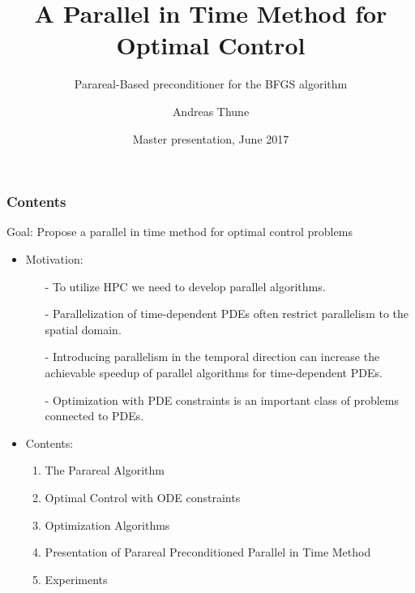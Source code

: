 \documentclass[9pt]{beamer}
\title{A Parallel in Time Method for Optimal Control}
\subtitle{Parareal-Based preconditioner for the BFGS algorithm}
\author{Andreas Thune}
\institute[UiO]{Faculty of Mathematics \\University of Oslo,\\Simula Research Laboratory}
\date{Master presentation, June 2017}
\begin{document}
 
\frame{\titlepage}
\begin{frame}
\frametitle{Contents}
\begin{block}{}
\centering
\alert{Goal}: Propose a parallel in time method for optimal control problems
\end{block}
\begin{itemize}
\item{Motivation:
\begin{itemize}
\item[-]{To utilize HPC we need to develop parallel algorithms.}
\item[-]{Parallelization of time-dependent PDEs often restrict parallelism to the spatial domain.}
\item[-]{Introducing parallelism in the temporal direction can increase the achievable speedup of parallel algorithms for time-dependent PDEs. }
\item[-]{Optimization with PDE constraints is an important class of problems connected to PDEs.}
\end{itemize}}
\item{Contents:
\begin{enumerate}[I]
\item{The Parareal Algorithm}
\item{Optimal Control with ODE constraints}
\item{Optimization Algorithms}
\item{Presentation of Parareal Preconditioned Parallel in Time Method}
\item{Experiments}
\end{enumerate}}
\end{itemize}
\end{frame}
\end{document}
